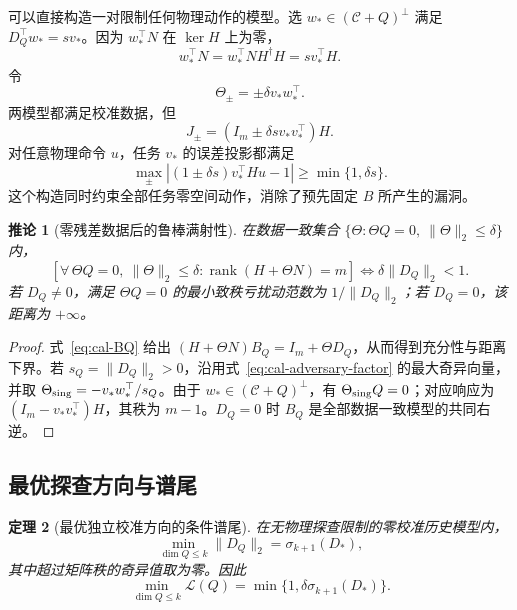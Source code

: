 \documentclass[11pt,a4paper]{article}
\numberwithin{equation}{section}
\newtheorem{theorem}{定理}[section]
\newtheorem{corollary}[theorem]{推论}
\theoremstyle{definition}
\begin{document}
可以直接构造一对限制任何物理动作的模型。选 $w_*\in(\mathcal C+Q)^\perp$ 满足 $D_Q^\top w_*=sv_*$。因为 $w_*^\top N$ 在 $\ker H$ 上为零，
\begin{equation}
  w_*^\top N
  =w_*^\top NH^\dagger H
  =sv_*^\top H .
  \label{eq:cal-adversary-factor}
\end{equation}
令
\begin{equation}
  \Theta_\pm=\pm\delta v_*w_*^\top .
\end{equation}
两模型都满足校准数据，但
\begin{equation}
  J_\pm=
  (I_m\pm\delta s v_*v_*^\top)H .
  \label{eq:cal-adversary-J}
\end{equation}
对任意物理命令 $u$，任务 $v_*$ 的误差投影都满足
\begin{equation}
  \max_{\pm}
  \left|
  (1\pm\delta s)v_*^\top Hu-1
  \right|
  \ge\min\{1,\delta s\}.
  \label{eq:cal-anyphysical-lower}
\end{equation}
这个构造同时约束全部任务零空间动作，消除了预先固定 $B$ 所产生的漏洞。

\begin{corollary}[零残差数据后的鲁棒满射性]
\label{rev:cor:conditional-surjectivity}
在数据一致集合 $\{\Theta:\Theta Q=0,\ \|\Theta\|_2\le\delta\}$ 内，
\begin{equation}
 \left[
 \forall\,\Theta Q=0,\ \|\Theta\|_2\le\delta:
 \operatorname{rank}(H+\Theta N)=m
 \right]
 \iff
 \delta\|D_Q\|_2<1 .
 \label{rev:eq:conditional-rank}
\end{equation}
若 $D_Q\ne0$，满足 $\Theta Q=0$ 的最小致秩亏扰动范数为 $1/\|D_Q\|_2$；若 $D_Q=0$，该距离为 $+\infty$。
\end{corollary}
\begin{proof}
式~\eqref{eq:cal-BQ} 给出
$(H+\Theta N)B_Q=I_m+\Theta D_Q$，从而得到充分性与距离下界。若 $s_Q=\|D_Q\|_2>0$，沿用式~\eqref{eq:cal-adversary-factor} 的最大奇异向量，并取
$\Theta_{\rm sing}=-v_*w_*^\top/s_Q$。由于
$w_*\in(\mathcal C+Q)^\perp$，有 $\Theta_{\rm sing}Q=0$；对应响应为 $(I_m-v_*v_*^\top)H$，其秩为 $m-1$。$D_Q=0$ 时 $B_Q$ 是全部数据一致模型的共同右逆。
\end{proof}

\subsection{最优探查方向与谱尾}

\begin{theorem}[最优独立校准方向的条件谱尾]
\label{thm:cal-width}
在无物理探查限制的零校准历史模型内，
\begin{equation}
  \min_{\dim Q\le k}\|D_Q\|_2
  =\sigma_{k+1}(D_*),
  \label{eq:cal-quotient-width}
\end{equation}
其中超过矩阵秩的奇异值取为零。因此
\begin{equation}
  \boxed{
  \min_{\dim Q\le k}\mathcal L(Q)
  =\min\{1,\delta\sigma_{k+1}(D_*)\}.}
  \label{eq:cal-minimax-width}
\end{equation}
\end{theorem}
\end{document}
